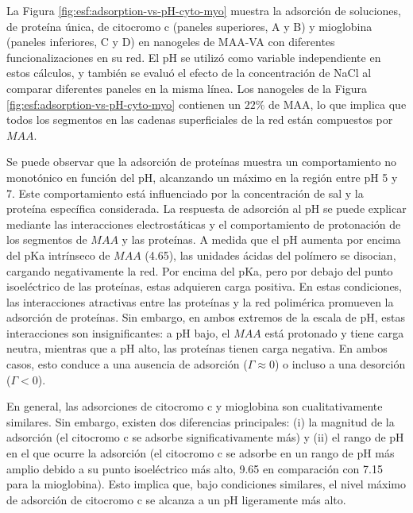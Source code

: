  La Figura \ref{fig:esf:adsorption-vs-pH-cyto-myo} muestra la adsorci\'on de soluciones, de prote\'ina \'unica, de citocromo c (paneles superiores, A y B) y mioglobina (paneles inferiores, C y D) en nanogeles de MAA-VA con diferentes funcionalizaciones en su red. El pH se utiliz\'o como variable independiente en estos c\'alculos, y tambi\'en se evalu\'o el efecto de la concentraci\'on de NaCl al comparar diferentes paneles en la misma l\'inea. Los nanogeles de la Figura \ref{fig:esf:adsorption-vs-pH-cyto-myo} contienen un $22\%$ de MAA, lo que implica que todos los segmentos en las cadenas superficiales de la red est\'an compuestos por $MAA$.
 
 Se puede observar que la adsorci\'on de prote\'inas muestra un comportamiento no monot\'onico en funci\'on del pH, alcanzando un m\'aximo en la regi\'on entre pH 5 y 7. Este comportamiento est\'a influenciado por la concentraci\'on de sal y la prote\'ina espec\'ifica considerada. La respuesta de adsorci\'on al pH se puede explicar mediante las interacciones electrost\'aticas y el comportamiento de protonaci\'on de los segmentos de $MAA$ y las prote\'inas. A medida que el pH aumenta por encima del pKa intr\'inseco de $MAA$ (4.65), las unidades \'acidas del pol\'imero se disocian, cargando negativamente la red. Por encima del pKa, pero por debajo del punto isoel\'ectrico de las prote\'inas, estas adquieren carga positiva. En estas condiciones, las interacciones atractivas entre las prote\'inas y la red polim\'erica promueven la adsorci\'on de prote\'inas. Sin embargo, en ambos extremos de la escala de pH, estas interacciones son insignificantes: a pH bajo, el $MAA$ est\'a protonado y tiene carga neutra, mientras que a pH alto, las prote\'inas tienen carga negativa. En ambos casos, esto conduce a una ausencia de adsorci\'on ($\Gamma \approx 0$) o incluso a una desorci\'on ($\Gamma < 0$).
 
 
 
 
En general, las adsorciones de citocromo c y mioglobina son cualitativamente similares. Sin embargo, existen dos diferencias principales: (i) la magnitud de la adsorci\'on (el citocromo c se adsorbe significativamente m\'as) y (ii) el rango de pH en el que ocurre la adsorci\'on (el citocromo c se adsorbe en un rango de pH m\'as amplio debido a su punto isoel\'ectrico m\'as alto, 9.65 en comparaci\'on con 7.15 para la mioglobina). Esto implica que, bajo condiciones similares, el nivel m\'aximo de adsorci\'on de citocromo c se alcanza a un pH ligeramente m\'as alto.

